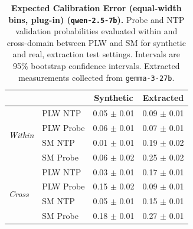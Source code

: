\begin{table}[ht]
\centering
\begin{tabular}{ll cc}
\toprule
& & Synthetic & Extracted \\
\midrule
\multirow{4}{*}{\textit{Within}}
& PLW NTP & 0.05 $\pm$ 0.01 & 0.09 $\pm$ 0.01 \\
& PLW Probe & 0.06 $\pm$ 0.01 & 0.07 $\pm$ 0.01 \\
& SM NTP & 0.01 $\pm$ 0.01 & 0.19 $\pm$ 0.02 \\
& SM Probe & 0.06 $\pm$ 0.02 & 0.25 $\pm$ 0.02 \\
\midrule
\multirow{4}{*}{\textit{Cross}}
& PLW NTP & 0.03 $\pm$ 0.01 & 0.17 $\pm$ 0.01 \\
& PLW Probe & 0.15 $\pm$ 0.02 & 0.09 $\pm$ 0.01 \\
& SM NTP & 0.05 $\pm$ 0.01 & 0.15 $\pm$ 0.01 \\
& SM Probe & 0.18 $\pm$ 0.01 & 0.27 $\pm$ 0.01 \\
\bottomrule
\end{tabular}
\caption{\textbf{Expected Calibration Error (equal-width bins, plug-in) (\texttt{qwen-2.5-7b}).} Probe and NTP validation probabilities evaluated within and cross-domain between PLW and SM for synthetic and real, extraction test settings. Intervals are 95\% bootstrap confidence intervals. Extracted measurements collected from \texttt{gemma-3-27b}.}
\label{tab:qwen-2.5-7b-gemma-3-27b-pond_supermat-ece}
\end{table}
